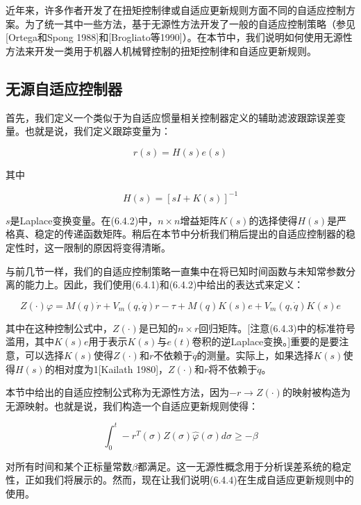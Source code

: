 \documentclass[12pt,a4paper]{ctexart}
\begin{document}
近年来，许多作者开发了在扭矩控制律或自适应更新规则方面不同的自适应控制方案。为了统一其中一些方法，基于无源性方法开发了一般的自适应控制策略（参见[Ortega和Spong 1988]和[Brogliato等1990]）。在本节中，我们说明如何使用无源性方法来开发一类用于机器人机械臂控制的扭矩控制律和自适应更新规则。

\subsection*{无源自适应控制器}

首先，我们定义一个类似于为自适应惯量相关控制器定义的辅助滤波跟踪误差变量。也就是说，我们定义跟踪变量为：

\begin{equation}\label{eq:tracking-var}
r(s) = H(s)e(s)
\end{equation}

其中

\begin{equation}\label{eq:H-def}
H(s) = [sI + K(s)]^{-1}
\end{equation}

$s$是Laplace变换变量。在(6.4.2)中，$n \times n$增益矩阵$K(s)$的选择使得$H(s)$是严格真、稳定的传递函数矩阵。稍后在本节中分析我们稍后提出的自适应控制器的稳定性时，这一限制的原因将变得清晰。

与前几节一样，我们的自适应控制策略一直集中在将已知时间函数与未知常参数分离的能力上。因此，我们使用(6.4.1)和(6.4.2)中给出的表达式来定义：

\begin{equation}\label{eq:Z-def}
Z(\cdot)\varphi = M(q)\dot{r} + V_m(q, \dot{q})r - \tau + M(q)K(s)e + V_m(q, \dot{q})K(s)e
\end{equation}

其中在这种控制公式中，$Z(\cdot)$是已知的$n \times r$回归矩阵。[注意(6.4.3)中的标准符号滥用，其中$K(s)e$用于表示$K(s)$与$e(t)$卷积的逆Laplace变换。]重要的是要注意，可以选择$K(s)$使得$Z(\cdot)$和$r$不依赖于$\ddot{q}$的测量。实际上，如果选择$K(s)$使得$H(s)$的相对度为1[Kailath 1980]，$Z(\cdot)$和$r$将不依赖于$\ddot{q}$。

本节中给出的自适应控制公式称为无源性方法，因为$-r \rightarrow Z(\cdot)$的映射被构造为无源映射。也就是说，我们构造一个自适应更新规则使得：

\begin{equation}\label{eq:passivity}
\int_0^t -r^T(\sigma)Z(\sigma)\hat{\varphi}(\sigma)d\sigma \geq -\beta
\end{equation}

对所有时间和某个正标量常数$\beta$都满足。这一无源性概念用于分析误差系统的稳定性，正如我们将展示的。然而，现在让我们说明(6.4.4)在生成自适应更新规则中的使用。
\end{document}
